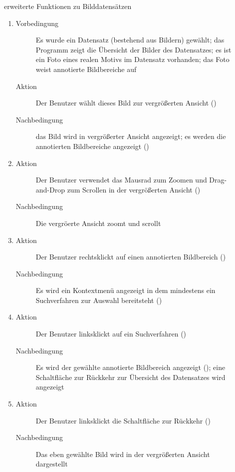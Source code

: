 \begin{description}
	\item[] erweiterte Funktionen zu Bilddatensätzen
	\begin{enumerate}
		\item
		\begin{description}
			\item[Vorbedingung] Es wurde ein Datensatz (bestehend aus Bildern) gewählt; das Programm zeigt die Übersicht der Bilder des Datensatzes; es ist ein Foto eines realen Motivs im Datensatz vorhanden; das Foto weist annotierte Bildbereiche auf
			\item[Aktion] Der Benutzer wählt dieses Bild zur vergrößerten Ansicht ()
			\item[Nachbedingung] das Bild wird in vergrößerter Ansicht angezeigt; es werden die annotierten Bildbereiche angezeigt ()
		\end{description}
		\item
		\begin{description}
			\item[Aktion] Der Benutzer verwendet das Mausrad zum Zoomen und Drag-and-Drop zum Scrollen in der vergrößerten Ansicht ()
			\item[Nachbedingung] Die vergröerte Ansicht zoomt und scrollt
		\end{description}
		\item
		\begin{description}
			\item[Aktion] Der Benutzer rechtsklickt auf einen annotierten Bildbereich ()
			\item[Nachbedingung] Es wird ein Kontextmenü angezeigt in dem mindestens ein Suchverfahren zur Auswahl bereitsteht ()
		\end{description}
		\item
		\begin{description}
			\item[Aktion] Der Benutzer linksklickt auf ein Suchverfahren ()
			\item[Nachbedingung] Es wird der gewählte annotierte Bildbereich angezeigt (); eine Schaltfläche zur Rückkehr zur Übersicht des Datensatzes wird angezeigt
		\end{description}
		\item
		\begin{description}
			\item[Aktion] Der Benutzer linksklickt die Schaltfläche zur Rückkehr ()
			\item[Nachbedingung] Das eben gewählte Bild wird in der vergrößerten Ansicht dargestellt

\end{description}
\end{enumerate}
\end{description}
